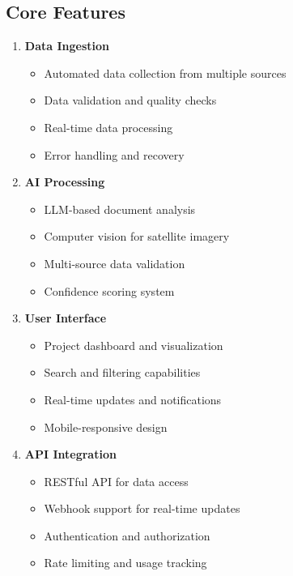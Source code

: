 \documentclass[business]{../templates/infraradar-main}
\begin{document}
\subsection{Core Features}
\begin{enumerate}
    \item \textbf{Data Ingestion}
    \begin{itemize}
        \item Automated data collection from multiple sources
        \item Data validation and quality checks
        \item Real-time data processing
        \item Error handling and recovery
    \end{itemize}
    
    \item \textbf{AI Processing}
    \begin{itemize}
        \item LLM-based document analysis
        \item Computer vision for satellite imagery
        \item Multi-source data validation
        \item Confidence scoring system
    \end{itemize}
    
    \item \textbf{User Interface}
    \begin{itemize}
        \item Project dashboard and visualization
        \item Search and filtering capabilities
        \item Real-time updates and notifications
        \item Mobile-responsive design
    \end{itemize}
    
    \item \textbf{API Integration}
    \begin{itemize}
        \item RESTful API for data access
        \item Webhook support for real-time updates
        \item Authentication and authorization
        \item Rate limiting and usage tracking
    \end{itemize}
\end{enumerate}
\end{document}
